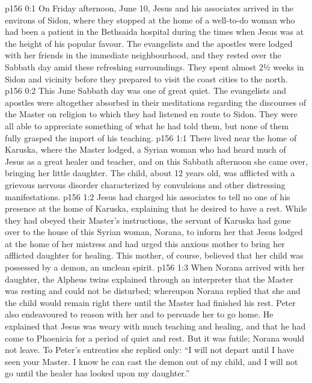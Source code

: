 \author{Midwayer Commission}
\vs p156 0:1 On Friday afternoon, June 10, Jesus and his associates arrived in the environs of Sidon, where they stopped at the home of a well\hyp{}to\hyp{}do woman who had been a patient in the Bethsaida hospital during the times when Jesus was at the height of his popular favour. The evangelists and the apostles were lodged with her friends in the immediate neighbourhood, and they rested over the Sabbath day amid these refreshing surroundings. They spent almost 2½ weeks in Sidon and vicinity before they prepared to visit the coast cities to the north.
\vs p156 0:2 This June Sabbath day was one of great quiet. The evangelists and apostles were altogether absorbed in their meditations regarding the discourses of the Master on religion to which they had listened en route to Sidon. They were all able to appreciate something of what he had told them, but none of them fully grasped the import of his teaching.
\vs p156 1:1 There lived near the home of Karuska, where the Master lodged, a Syrian woman who had heard much of Jesus as a great healer and teacher, and on this Sabbath afternoon she came over, bringing her little daughter. The child, about 12 years old, was afflicted with a grievous nervous disorder characterized by convulsions and other distressing manifestations.
\vs p156 1:2 Jesus had charged his associates to tell no one of his presence at the home of Karuska, explaining that he desired to have a rest. While they had obeyed their Master’s instructions, the servant of Karuska had gone over to the house of this Syrian woman, Norana, to inform her that Jesus lodged at the home of her mistress and had urged this anxious mother to bring her afflicted daughter for healing. This mother, of course, believed that her child was possessed by a demon, an unclean spirit.
\vs p156 1:3 When Norana arrived with her daughter, the Alpheus twins explained through an interpreter that the Master was resting and could not be disturbed; whereupon Norana replied that she and the child would remain right there until the Master had finished his rest. Peter also endeavoured to reason with her and to persuade her to go home. He explained that Jesus was weary with much teaching and healing, and that he had come to Phoenicia for a period of quiet and rest. But it was futile; Norana would not leave. To Peter’s entreaties she replied only: “I will not depart until I have seen your Master. I know he can cast the demon out of my child, and I will not go until the healer has looked upon my daughter.”
